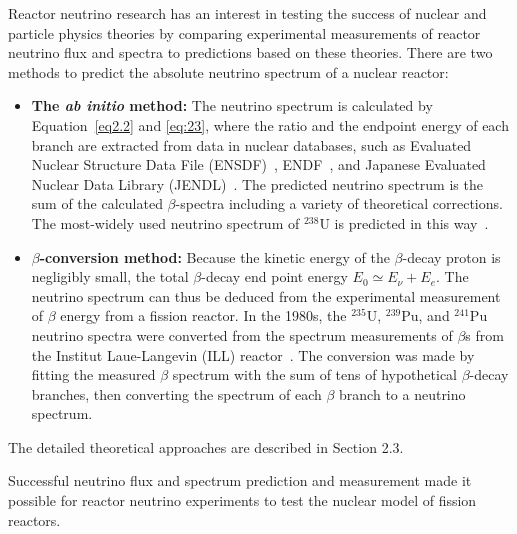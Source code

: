     Reactor neutrino research has an interest in testing the success of nuclear and particle physics theories by comparing experimental measurements of reactor neutrino flux and spectra to predictions based on these theories.
    There are two methods to predict the absolute neutrino spectrum of a nuclear reactor:
    \begin{itemize}
        \item \textbf{The \textit{ab initio} method:} The neutrino spectrum is calculated by Equation~\ref{eq2.2} and \ref{eq:23},
        where the ratio and the endpoint energy of each branch are extracted from data in nuclear databases, such as Evaluated Nuclear Structure Data File (ENSDF)~\cite{bib:ENSDF}, ENDF~\cite{bib:ENDF}, and Japanese Evaluated Nuclear Data Library (JENDL)~\cite{bib:JENDL}.
        The predicted neutrino spectrum is the sum of the calculated $\beta$-spectra including a variety of theoretical corrections. 
        The most-widely used neutrino spectrum of $^{238}$U is predicted in this way~\cite{bib:vogel}.
        \item \textbf{$\beta$-conversion method:} Because the kinetic energy of the $\beta$-decay proton is negligibly small, the total $\beta$-decay end point energy $E_0 \simeq E_\nu + E_e$.
        The neutrino spectrum can thus be deduced from the experimental measurement of $\beta$ energy from a fission reactor. 
        In the 1980s, the $^{235}$U, $^{239}$Pu, and $^{241}$Pu neutrino spectra were converted from the spectrum measurements of $\beta$s from the Institut Laue-Langevin (ILL) reactor~\cite{bib:ILL1982,bib:ILL1985,bib:ILL1989}.
        The conversion was made by fitting the measured $\beta$ spectrum with the sum of tens of hypothetical $\beta$-decay branches, then converting the spectrum of each $\beta$ branch to a neutrino spectrum.
    \end{itemize}
    The detailed theoretical approaches are described in Section 2.3.
    
    Successful neutrino flux and spectrum prediction and measurement made it possible for reactor neutrino experiments to test the nuclear model of fission reactors.


